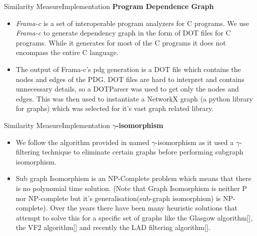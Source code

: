 \documentclass{beamer}
\begin{document}
\begin{frame}{Similarity Measure}{Implementation}
    \textbf{Program Dependence Graph}
        \begin{itemize}
            \item \textit{Frama-c} is a set of interoperable program analyzers for C programs. We use \textit{Frama-c} to generate dependency graph in the form of DOT files for C programs. While it generates for most of the C programs it does not encompass the entire C language. 
            \item The output of Frama-c's pdg generation is a DOT file which contains the nodes and edges of the PDG. DOT files are hard to interpret and contains unnecessary details, so a DOTParser was used to get only the nodes and edges. This was then used to instantiate a NetworkX graph (a python library for graphs) which was selected for it's vast graph related library.
        \end{itemize}
\end{frame}

\begin{frame}{Similarity Measure}{Implementation}
    \textbf{$\gamma$-isomorphism}
    \begin{itemize}
        \item We follow the algorithm provided in \cite{Liu:2006:GDS:1150402.1150522} named $\gamma$-isomorphism as it used a $\gamma$-filtering technique to eliminate certain graphs before performing subgraph isomorphism.
        
        \item  Sub graph Isomorphism is an NP-Complete problem which means that there is no polynomial time solution. (Note that Graph Isomorphism is neither P nor NP-complete but it's generalisation(sub-graph isomorphism) is NP-complete). Over the years there have been many heuristic solutions that attempt to solve this for a specific set of graphs like the Glasgow algorithm[\cite{Glasgow}], the VF2 algorithm[\cite{VFLib}] and recently the LAD filtering algorithm[\cite{pathLAD}].
    \end{itemize}
\end{frame}
\end{document}
